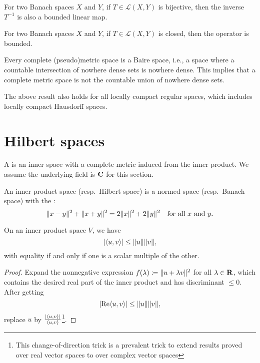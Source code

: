 \begin{cor}
    For two Banach spaces $X$ and $Y$, if $T\in \mathcal L(X,Y)$ is bijective, then the inverse $T^{-1}$ is also a bounded linear map.
\end{cor}

\begin{namedthm}
    For two Banach spaces $X$ and $Y$, if $T\in \mathcal L(X,Y)$ is closed, then the operator is bounded.
\end{namedthm}

\begin{namedthm}
    Every complete (pseudo)metric space is a Baire space, i.e., a space where a countable intersection of nowhere dense sets is nowhere dense. This implies that a complete metric space is not the countable union of nowhere dense sets.

    The above result also holds for all locally compact regular spaces, which includes locally compact Hausdorff spaces.
\end{namedthm}

\section{Hilbert spaces}
A  is an inner space with a complete metric induced from the inner product. We assume the underlying field is $\mathbf{C}$ for this section.

\begin{prop}
    An inner product space (resp.\ Hilbert space) is a normed space (resp.\ Banach space) with the : \[
        \lVert x - y \rVert^2 + \lVert x + y \rVert^2 = 2 \lVert x \rVert^2 + 2\lVert y \rVert^2 \quad \text{for all }x\text{ and }y.
    \]
\end{prop}

\begin{namedthm} \label{thm:Cauchy-Schwarz}
    On an inner product space $V$, we have \[
        \lvert \langle u, v \rangle \rvert \leq \lVert u \rVert\lVert v \rVert,
    \] with equality if and only if one is a scalar multiple of the other.
\end{namedthm}
\begin{proof}
    Expand the nonnegative expression $f(\lambda) \coloneqq \lVert u+\lambda v \rVert^2$ for all $\lambda\in \mathbf{R}$, which contains the desired real part of the inner product and has discriminant $\leq 0$. After getting \[
        \lvert \operatorname{Re} \langle u, v \rangle \rvert \leq \lVert u \rVert\lVert v \rVert,
    \] replace $u$ by $\frac{\lvert \langle u, v \rangle \rvert}{\langle u, v \rangle}$\footnote{This change-of-direction trick is a prevalent trick to extend results proved over real vector spaces to over complex vector spaces}.
\end{proof}

